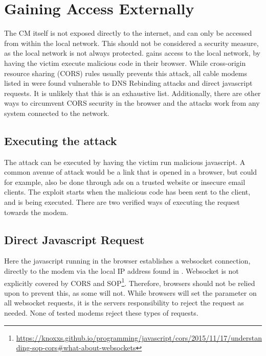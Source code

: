\chapter{Gaining Access Externally}
\label{cha:dns}
The CM itself is not exposed directly to the internet, and can only be accessed from within the local network.
This should not be considered a security measure, as the local network is not always protected.
\exploitname{} gains access to the local network, by having the victim execute malicious code in their browser.
While cross-origin resource sharing (CORS) rules usually prevents this attack, all cable modems listed in  were found vulnerable to DNS Rebinding attacks and direct javascript requests.
It is unlikely that this is an exhaustive list.
Additionally, there are other ways to circumvent CORS security in the browser and the attacks work from any system connected to the network.

\section{Executing the attack}
The attack can be executed by having the victim run malicious javascript.
A common avenue of attack would be a link that is opened in a browser, but could for example, also be done through ads on a trusted website or insecure email clients.
The exploit starts when the malicious code has been sent to the client, and is being executed.
There are two verified ways of executing the request towards the modem.

\section{Direct Javascript Request}
Here the javascript running in the browser establishes a websocket connection, directly to the modem via the local IP address found in .
Websocket is not explicitly covered by CORS and SOP\footnote{\url{https://knoxxs.github.io/programming/javascript/cors/2015/11/17/understanding-sop-cors\#what-about-websockets}}. 
Therefore, browsers should not be relied upon to prevent this, as some will not. 
While browsers will set the  parameter on all websocket requests, it is the servers responsibility to reject the request as needed. 
None of tested modems reject these types of requests.


